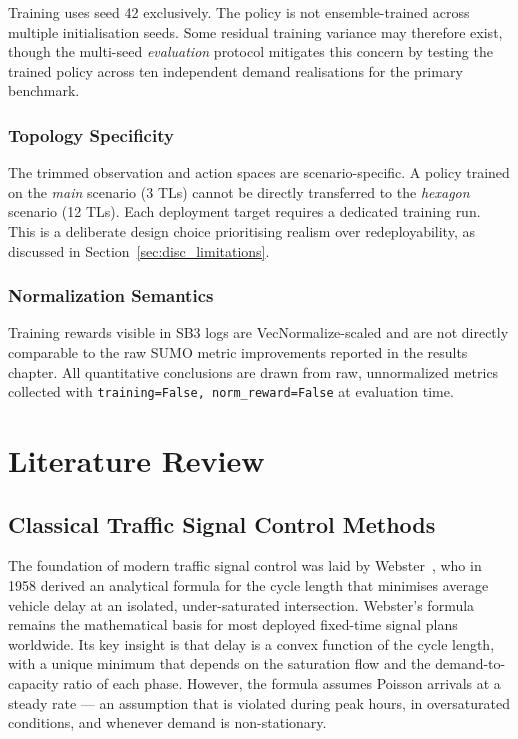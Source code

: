 \documentclass[12pt,oneside,a4paper]{report}
\begin{document}
Training uses seed 42 exclusively.  The policy is not ensemble-trained
across multiple initialisation seeds.  Some residual training variance
may therefore exist, though the multi-seed \emph{evaluation} protocol
mitigates this concern by testing the trained policy across ten
independent demand realisations for the primary benchmark.

\subsection*{Topology Specificity}

The trimmed observation and action spaces are scenario-specific.
A policy trained on the \textit{main} scenario (3 TLs) cannot be
directly transferred to the \textit{hexagon} scenario (12 TLs).
Each deployment target requires a dedicated training run.  This is
a deliberate design choice prioritising realism over redeployability,
as discussed in Section~\ref{sec:disc_limitations}.

\subsection*{Normalization Semantics}

Training rewards visible in SB3 logs are VecNormalize-scaled and
are not directly comparable to the raw SUMO metric improvements
reported in the results chapter.  All quantitative conclusions
are drawn from raw, unnormalized metrics collected with
\texttt{training=False, norm\_reward=False} at evaluation time.

\chapter{Literature Review}
\label{chap:lit}

\section{Classical Traffic Signal Control Methods}
\label{sec:lit_classical}

The foundation of modern traffic signal control was laid by
Webster~\cite{lammerhelbing2008}, who in 1958 derived an analytical
formula for the cycle length that minimises average vehicle delay
at an isolated, under-saturated intersection.  Webster's formula
remains the mathematical basis for most deployed fixed-time signal
plans worldwide.  Its key insight is that delay is a convex function
of the cycle length, with a unique minimum that depends on the
saturation flow and the demand-to-capacity ratio of each phase.
However, the formula assumes Poisson arrivals at a steady
rate --- an assumption that is violated during peak hours, in
oversaturated conditions, and whenever demand is non-stationary.
\end{document}
